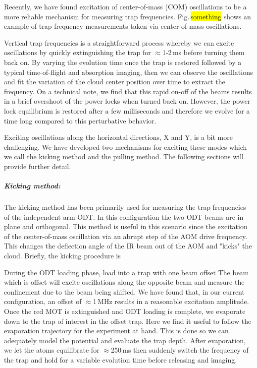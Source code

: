 Recently, we have found excitation of center-of-mass (COM) oscillations to be a more reliable mechanism for measuring trap frequencies.
Fig.\,\hl{something} shows an example of trap frequency measurements taken via center-of-mass oscillations.

Vertical trap frequencies is a straightforward process whereby we can excite oscillations by quickly extinguishing the trap for $\approx$1-2\,ms before turning them back on.
By varying the evolution time once the trap is restored followed by a typical time-of-flight and absorption imaging, then we can observe the oscillations and fit the variation of the cloud center position over time to extract the frequency.
On a technical note, we find that this rapid on-off of the beams results in a brief overshoot of the power locks when turned back on.
However, the power lock equilibrium is restored after a few milliseconds and therefore we evolve for a time long compared to this perturbative behavior.

Exciting oscillations along the horizontal directions, X and Y, is a bit more challenging.
We have developed two mechanisms for exciting these modes which we call the kicking method and the pulling method.
The following sections will provide further detail.

\subparagraph{Kicking method:}
The kicking method has been primarily used for measuring the trap frequencies of the independent arm ODT.
In this configuration the two ODT beams are in plane and orthogonal.
This method is useful in this scenario since the excitation of the center-of-mass oscillation via an abrupt step of the AOM drive frequency.
This changes the deflection angle of the IR beam out of the AOM and "kicks" the cloud.
Briefly, the kicking procedure is 
\begin{outline}[enumerate]
	\1 During the ODT loading phase, load into a trap with one beam offset
		\2 The beam which is offset will excite oscillations along the opposite beam and measure the confinement due to the beam being shifted.
		\2 We have found that, in our current configuration, an offset of $\approx$1\,MHz results in a reasonable excitation amplitude.
	\1 Once the red MOT is extinguished and ODT loading is complete, we evaporate down to the trap of interest in the offset trap.
		\2 Here we find it useful to follow the evaporation trajectory for the experiment at hand. This is done so we can adequately model the potential and evaluate the trap depth.
	\1 After evaporation, we let the atoms equilibrate for $\approx$250\,ms then suddenly switch the frequency of the trap and hold for a variable evolution time before releasing and imaging.
\end{outline}

